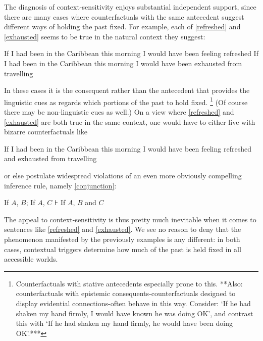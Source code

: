 \documentclass[If.tex]{subfiles}
\begin{document}
\begin{prop}
The diagnosis of context-sensitivity enjoys substantial independent support, since there are many cases where counterfactuals with the same antecedent suggest different ways of holding the past fixed. For example, each of \ref{refreshed} and \ref{exhausted} seems to be true in the natural context they suggest:
\begin{prop}
	\nitem \label{refreshed}
		If I had been in the Caribbean this morning I would have been feeling refreshed
	\nitem \label{exhausted}
		If I had been in the Caribbean this morning I would have been exhausted from travelling
\end{prop}
In these cases it is the consequent rather than the antecedent that provides the linguistic cues as regards which portions of the past to hold fixed.%
\footnote{Counterfactuals with stative antecedents especially prone to this.  **Also: counterfactuals with epistemic consequents-counterfactuals designed to display evidential connections-often behave in this way.  Consider: ‘If he had shaken my hand firmly, I would have known he was doing OK’, and contrast this with ‘If he had shaken my hand firmly, he would have been doing OK’.***}  
(Of course there may be non-linguistic cues as well.) On a view where \ref{refreshed} and \ref{exhausted} are both true in the same context, one would have to either live with bizarre counterfactuals like
\begin{prop}
	\nitem \label{refreshedexhausted}
		If I had been in the Caribbean this morning I would have been feeling refreshed and exhausted from travelling
\end{prop}
or else postulate widespread violations of an even more obviously compelling inference rule, namely \ref{conjunction}:
\begin{prop}  
	\litem[Conjunction] \label{conjunction}
	If $A$, $B$; If $A$, $C$ ⊦ If $A$, $B$ and $C$ 
\end{prop}
The appeal to context-sensitivity is thus pretty much inevitable when it comes to sentences like \ref{refreshed} and \ref{exhausted}. We see no reason to deny that the phenomenon manifested by the previously examples is any different: in both cases, contextual triggers determine how much of the past is held fixed in all accessible worlds.


\end{prop}
\end{document}
